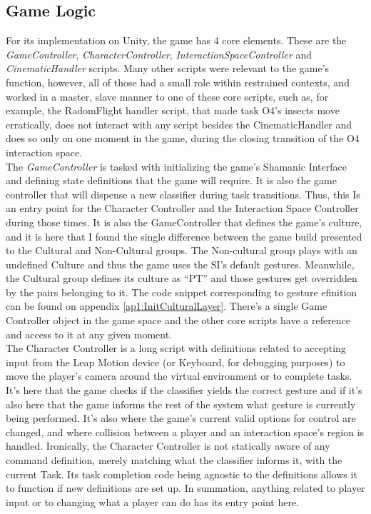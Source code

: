 \subsection{Game Logic} \label{sec:develop_game_logic}
    For its implementation on Unity, the game has 4 core elements. These are the \emph{GameController}, \emph{CharacterController}, \emph{InteractionSpaceController} and \emph{CinematicHandler} scripts. Many other scripts were relevant to the game’s function, however, all of those had a small role within restrained contexts, and worked in a master, slave manner to one of these core scripts, such as, for example, the RadomFlight handler script, that made task O4’s insects move erratically, does not interact with any script besides the CinematicHandler and does so only on one moment in the game, during the closing transition of the O4 interaction space.\\
    The \emph{GameController} is tasked with initializing the game’s Shamanic Interface and defining state definitions that the game will require. It is also the game controller that will dispense a new classifier during task transitions. Thus, this Is an entry point for the Character Controller and the Interaction Space Controller during those times. It is also the GameController that defines the game’s culture, and it is here that I found the single difference between the game build presented to the Cultural and Non-Cultural groups. The Non-cultural group plays with an undefined Culture and thus the game uses the SI’s default gestures. Meanwhile, the Cultural group defines its culture as “PT” and those gestures get overridden by the pairs belonging to it. The code snippet corresponding to gesture efinition can be found on appendix \ref{ap1:InitCulturalLayer}. There’s a single Game Controller object in the game space and the other core scripts have a reference and access to it at any given moment.\\
    The Character Controller is a long script with definitions related to accepting input from the Leap Motion device (or Keyboard, for debugging purposes) to move the player’s camera around the virtual environment or to complete tasks. It’s here that the game checks if the classifier yields the correct gesture and if it’s also here that the game informs the rest of the system what gesture is currently being performed. It’s also where the game’s current valid options for control are changed, and where collision between a player and an interaction space’s region is handled. Ironically, the Character Controller is not statically aware of any command definition, merely matching what the classifier informs it, with the current Task. Its task completion code being agnostic to the definitions allows it to function if new definitions are set up. In summation, anything related to player input or to changing what a player can do has its entry point here.\\ 
